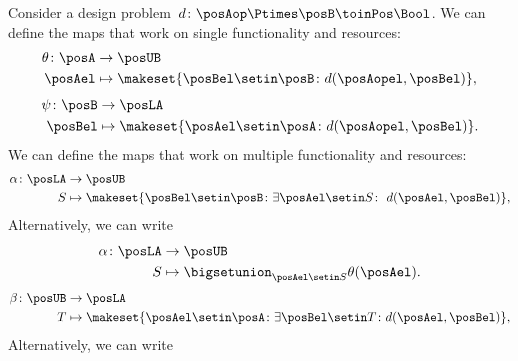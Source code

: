 Consider a design problem~$d\colon \posAop \Ptimes \posB \toinPos \Bool$.
We can define the maps that work on single functionality and resources:
%
\begin{equation}
    \begin{aligned}
        \theta\colon \posA & \to \posUB \\
        \posAel            & \mapsto \makeset{\posBel\setin \posB \colon d(\posAopel, \posBel) },
    \end{aligned}
\end{equation}
%
\begin{equation}
    \begin{aligned}
        \psi\colon \posB & \to \posLA \\
        \posBel          & \mapsto \makeset{\posAel\setin \posA \colon d(\posAopel, \posBel) }.
    \end{aligned}
\end{equation}
We can define the maps that work on multiple functionality and resources:
\begin{equation}
    \label{eq:galoisalfa}
    \begin{aligned}
        \alpha\colon \posLA & \to \posUB \\
        S                   & \mapsto \makeset{\posBel\setin \posB \colon \exists \posAel\setin S\colon \ d(\posAel,\posBel)},
    \end{aligned}
\end{equation}
Alternatively, we can write
\begin{equation}
    \begin{aligned}
        \alpha \colon \posLA & \to \posUB \\
        S                    & \mapsto \bigsetunion_{\posAel\setin S} \theta(\posAel).
    \end{aligned}
\end{equation}
%
\begin{equation}
    \label{eq:galoisbeta}
    \begin{aligned}
        \beta\colon \posUB & \to \posLA \\
        T                  & \mapsto \makeset{\posAel\setin \posA  \colon \exists \posBel\setin T\colon d(\posAel,\posBel)},
    \end{aligned}
\end{equation}
%
\noindent Alternatively, we can write
